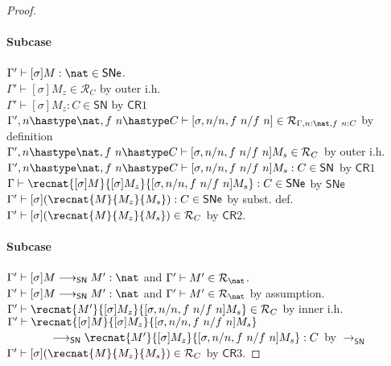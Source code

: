 \documentclass{article}
\makeatletter
\newtheorem{exercise}{Exercise}[section]
\newtheorem{@problem}{Exercise}[section]
\newenvironment{problem}{\begin{@problem}\rm}{\end{@problem}}
\newcommand{\SN}{\mathsf{SN}}
\newcommand{\SNe}{\mathsf{SNe}}
\newcommand{\CR}{\textsf{CR}}
\newcommand{\denot}[1]{\mathcal{R}_{#1}}
\newcommand{\inden}[3]{#1 \vdash #2 \in \denot{#3}}
\newcommand{\redSN}{\longrightarrow_\SN}
\makeatother
\begin{document}
\begin{proof}
 \paragraph{Subcase } $\Gamma' \vdash [\sigma]M : \nat \in \SNe$. \\
 $\inden{\Gamma'}{[\sigma]M_z}{C}$ \hfill by outer i.h.\\
 $\Gamma' \vdash [\sigma]M_z : C \in \SN$ \hfill by $\CR1$\\
 $\inden{\Gamma', n \hastype \nat, f~n \hastype C}{[\sigma, n/n, f~n/f~n]}{\Gamma, n:\nat, f~n:C}$ \hfill by definition \\
 $\inden{\Gamma', n \hastype \nat, f~n \hastype C}{[\sigma, n/n, f~n/f~n]M_s}{C}$ \hfill by outer i.h. \\
 $\Gamma', n \hastype \nat, f~n \hastype C \vdash [\sigma, n/n, f~n/f~n]M_s : C\in \SN$ \hfill by $\CR1$ \\
 $\Gamma \vdash \recnat{[\sigma]M}{[\sigma]M_z}{[\sigma, n/n, f~n/f~n]M_s} : C \in \SNe$ \hfill by $\SNe$\\
 $\Gamma' \vdash [\sigma](\recnat{M}{M_z}{M_s}) : C \in \SNe$ \hfill by subst. def. \\
 $\inden{\Gamma'}{[\sigma](\recnat{M}{M_z}{M_s})}{C}$ \hfill by $\CR2$.


 \paragraph{Subcase } $\Gamma' \vdash [\sigma]M \redSN M' : \nat$ and $\inden{\Gamma'}{M'}{\nat}$.\\
 $\Gamma' \vdash [\sigma]M \redSN M' : \nat$ and $\inden{\Gamma'}{M'}{\nat}$ \hfill by assumption.\\
 $\inden{\Gamma'}{\recnat{M'}{[\sigma]M_z}{[\sigma,n/n, f~n/f~n]M_s}}{C}$ \hfill by inner i.h. \\
 $\Gamma' \vdash \recnat{[\sigma]M}{[\sigma]M_z}{[\sigma,n/n, f~n/f~n]M_s}$ \\
 $\qquad \qquad \redSN \recnat{M'}{[\sigma]M_z}{[\sigma,n/n, f~n/f~n]M_s} : C$ \hfill by $\redSN$\\
 $\inden{\Gamma'}{[\sigma](\recnat{M}{M_z}{M_s})}{C}$ \hfill by $\CR3$.


 \end{proof}


\end{document}
